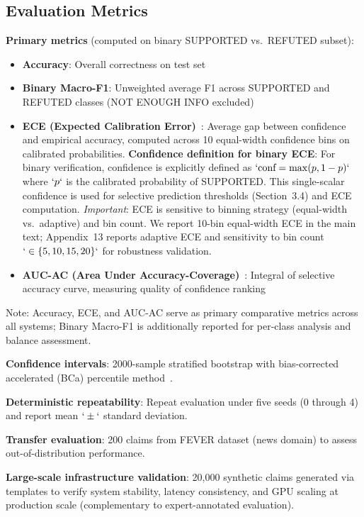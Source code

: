 \subsection{Evaluation Metrics}\label{evaluation-metrics}

\textbf{Primary metrics} (computed on binary SUPPORTED vs.~REFUTED subset):

\begin{itemize}
\item
  \textbf{Accuracy}: Overall correctness on test set
\item
  \textbf{Binary Macro-F1}: Unweighted average F1 across SUPPORTED and REFUTED classes (NOT ENOUGH INFO excluded)
\item
  \textbf{ECE (Expected Calibration Error)}~: Average gap between confidence and empirical accuracy, computed across 10 equal-width confidence bins on calibrated probabilities. \textbf{Confidence definition for binary ECE}: For binary verification, confidence is explicitly defined as \(`\text{conf} = \max(p, 1-p)`\) where \(`p`\) is the calibrated probability of SUPPORTED. This single-scalar confidence is used for selective prediction thresholds (Section~3.4) and ECE computation. \emph{Important}: ECE is sensitive to binning strategy (equal-width vs.~adaptive) and bin count. We report 10-bin equal-width ECE in the main text; Appendix~13 reports adaptive ECE and sensitivity to bin count \(`\in \{5, 10, 15, 20\}`\) for robustness validation.
\item
  \textbf{AUC-AC (Area Under Accuracy-Coverage)}~: Integral of selective accuracy curve, measuring quality of confidence ranking
\end{itemize}

Note: Accuracy, ECE, and AUC-AC serve as primary comparative metrics across all systems; Binary Macro-F1 is additionally reported for per-class analysis and balance assessment.

\textbf{Confidence intervals}: 2000-sample stratified bootstrap with bias-corrected accelerated (BCa) percentile method~.

\textbf{Deterministic repeatability}: Repeat evaluation under five seeds (0 through 4) and report mean \(`\pm`\) standard deviation.

\textbf{Transfer evaluation}: 200 claims from FEVER dataset (news domain) to assess out-of-distribution performance.

\textbf{Large-scale infrastructure validation}: 20,000 synthetic claims generated via templates to verify system stability, latency consistency, and GPU scaling at production scale (complementary to expert-annotated evaluation).

